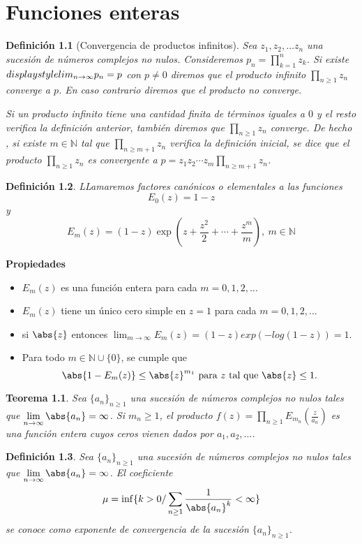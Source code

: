 \documentclass[10pt]{book}
\newtheorem{defi}{Definición}[chapter]
\newtheorem{theorem}{Teorema}[chapter]
\newcommand{\N}{\mathbb{N}}
\begin{document}
\chapter{Funciones enteras}
\begin{defi}[Convergencia de productos infinitos]
Sea $z_1,z_2,\ldots z_n$ una sucesión de números complejos no nulos. Consideremos $p_n =\prod_{k=1}^n z_k$. Si existe $\\displaystyle lim_{n\to \infty}p_n = p$ con $p\neq 0$ diremos que el producto infinito $\prod_{n\geq 1}z_n$ converge  a $p$. En caso contrario diremos que el producto no converge.

Si un producto infinito tiene una cantidad finita de términos iguales a $0$ y el resto verifica la definición anterior, también diremos que $\prod_{n\geq 1}z_n$ converge. De hecho , si existe $m\in \N$ tal que $\prod_{n\geq m+1}z_n$ verifica la definición inicial, se dice que el producto $\prod_{n\geq 1}z_n$ es convergente a $p = z_1z_2\cdots z_m\prod_{n\geq m+1}z_n$.
\end{defi}

\begin{defi}
LLamaremos factores canónicos o elementales a las funciones 
$$ E_0(z) = 1-z$$
y
$$E_m(z) = (1-z)\exp\left(z+\frac{z^2}{2}+\cdots + \frac{z^m}{m}\right),\ m\in\N$$
\end{defi}

\textbf{Propiedades}
\begin{itemize}
\item $E_m(z)$ es una función entera para cada $m = 0,1,2,\ldots$
\item $E_m(z)$ tiene un único cero simple en $z=1$ para cada   $m = 0,1,2,\ldots$
\item si $\abs{z}$ entonces $\displaystyle \lim_{m \to \infty} E_m(z) =(1-z) exp(-log(1-z))=1$.
\item Para todo $m\in \N \cup \{0\}$, se cumple que
$$\abs{1-E_m(z)} \leq \abs{z}^{m_1} \text{ para } z \text{ tal que } \abs{z}\leq 1.$$
\end{itemize}


\begin{theorem}
Sea $\{a_n\}_{n\geq 1}$ una sucesión de números complejos no nulos tales que $\displaystyle\lim_{n\to \infty} \abs{a_n} = \infty$. Si $m_n \geq 1$, el producto $f(z) = \prod_{n\geq1}E_{m_n}\left(\frac{z}{a_n}\right)$ es una función entera cuyos ceros vienen dados por $a_1,a_2,\ldots$.
\end{theorem}

\begin{defi}
Sea $\{a_n\}_{n\geq 1}$ una sucesión de números complejos no nulos tales que $\displaystyle\lim_{n\to \infty} \abs{a_n} = \infty$. El coeficiente
$$\mu = \inf\{k>0 / \sum_{n\geq 1}\frac{1}{\abs{a_n}^k} < \infty\}$$
se conoce como \textit{exponente de convergencia} de la sucesión $\{a_n\}_{n\geq 1}$.
\end{defi}
\end{document}
